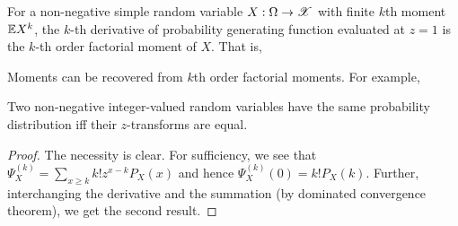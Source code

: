 \documentclass[letterpaper,10pt,english]{article}
\begin{document}


\begin{thm} 
For a non-negative simple random variable $X:\Omega \to \mathscr{X}$ with finite $k$th moment $\mathbb{E} X^k$, 
the $k$-th derivative of probability generating function evaluated at $z=1$ is the $k$-th order factorial moment of $X$. 
That is, 
\end{thm}
\begin{rem}
Moments can be recovered from $k$th order factorial moments. 
For example, 
\end{rem}
\begin{thm} 
Two  non-negative integer-valued random variables have the same probability distribution iff their $z$-transforms are equal. 
\end{thm}
\begin{proof}
The necessity is clear. 
For sufficiency, we see that $\Psi_X^{(k)} = \sum_{x \ge k}k!z^{x-k}P_X(x)$ and hence $\Psi_X^{(k)}(0) = k!P_X(k)$. 
Further, interchanging the derivative and the summation (by dominated convergence theorem), we get the second result. 
\end{proof}
\end{document}
